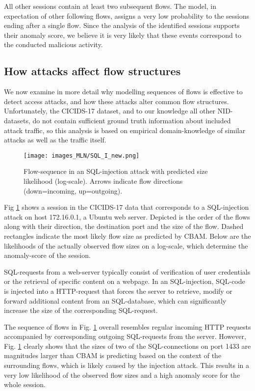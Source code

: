 All other sessions contain at least two subsequent flows. The model, in expectation of other following flows, assigns a very low probability to the sessions ending after a single flow. Since the analysis of the identified sessions supports their anomaly score, we believe it is very likely that these events correspond to the conducted malicious activity. 


\subsection{How attacks affect flow structures}\label{sec:AttackInfl}

We now examine in more detail why modelling sequences of flows is effective to detect access attacks, and how these attacks alter common flow structures. Unfortunately, the CICIDS-17 dataset, and to our knowledge all other NID-datasets, do not contain sufficient ground truth information about included attack traffic, so this analysis is based on empirical domain-knowledge of similar attacks as well as the traffic itself.

\begin{figure}[ht]
    \begin{center}
      \texttt{[image: images\_MLN/SQL\_I\_new.png]}
    \end{center}
    \caption{Flow-sequence in an SQL-injection attack with predicted size likelihood (log-scale). Arrows indicate flow directions (down=incoming, up=outgoing).}\label{fig:SQL_I}
\end{figure}


Fig \ref{fig:SQL_I} shows a session in the CICIDS-17 data that corresponds to a SQL-injection attack on host 172.16.0.1, a Ubuntu web server. Depicted is the order of the flows along with their direction, the destination port and the size of the flow. Dashed rectangles indicate the most likely flow size as predicted by CBAM. Below are the likelihoods of the actually observed flow sizes on a log-scale, which determine the anomaly-score of the session.

SQL-requests from a web-server typically consist of verification of user credentials or the retrieval of specific content on a webpage.
In an SQL-injection, SQL-code is injected into a HTTP-request that forces the server to retrieve, modify or forward additional content from an SQL-database, which can significantly increase the size of the corresponding SQL-request. 

The sequence of flows in Fig. \ref{fig:SQL_I} overall resembles regular incoming HTTP requests accompanied by corresponding outgoing SQL-requests from the server. However, 
Fig. \ref{fig:SQL_I} clearly shows that the sizes of two of the SQL-connections on port 1433 are magnitudes larger than CBAM is predicting based on the context of the surrounding flows, which is likely caused by the injection attack. This results in a very low likelihood of the observed flow sizes and a high anomaly score for the whole session.


